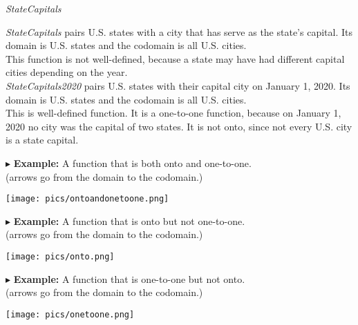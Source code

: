 \documentclass{ximera}
\begin{document}
\begin{example} \textit{StateCapitals}


\textit{StateCapitals} pairs U.S. states with a city that has serve as the state's capital. Its domain is U.S. states and the codomain is all U.S. cities.\\



This function is not well-defined, because a state may have had different capital cities depending on the year. \\


\textit{StateCapitals2020} pairs U.S. states with their capital city on January 1, 2020. Its domain is U.S. states and the codomain is all U.S. cities.\\


This is well-defined function.  It is a one-to-one function, because on January 1, 2020 no city was the capital of two states.  It is not onto, since not every U.S. city is a state capital.


\end{example}












$\blacktriangleright$ \textbf{Example:} A function that is both onto and one-to-one.  \\
(arrows go from the domain to the codomain.)

\begin{image}
\texttt{[image: pics/ontoandonetoone.png]}
\end{image}






$\blacktriangleright$ \textbf{Example:} A function that is onto but not one-to-one.  \\
(arrows go from the domain to the codomain.)

\begin{image}
\texttt{[image: pics/onto.png]}
\end{image}








$\blacktriangleright$ \textbf{Example:} A function that is one-to-one but not onto.  \\
(arrows go from the domain to the codomain.)

\begin{image}
\texttt{[image: pics/onetoone.png]}
\end{image}
\end{document}
